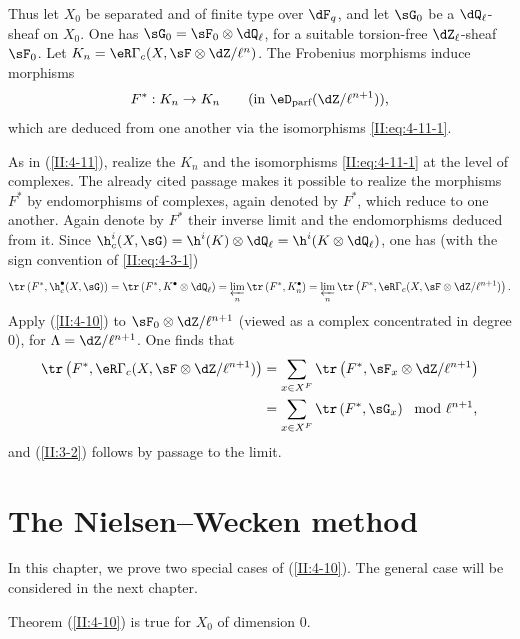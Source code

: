 \documentclass[oneside]{book}
\begin{document}
Thus let $X_0$ be separated and of finite type over $\dF_q$, and let $\sG_0$
be a $\dQ_\ell$-sheaf on $X_0$. One has
$\sG_0=\sF_0\otimes\dQ_\ell$, for a suitable torsion-free
$\dZ_\ell$-sheaf $\sF_0$. Let
$K_n=\eR\Gamma_c(X,\sF\otimes\dZ/\ell^n)$. The Frobenius morphisms induce
morphisms
\[
  F^* : K_n\to K_n \qquad \text{(in $\eD_\text{parf}(\dZ/\ell^{n+1})$),}
\]
which are deduced from one another via the isomorphisms
\eqref{II:eq:4-11-1}.

As in (\ref{II:4-11}), realize the $K_n$ and the isomorphisms
\eqref{II:eq:4-11-1} at the level of complexes. The already cited passage
\cite[XV.3.3]{sga5} makes it possible to realize the morphisms $F^*$ by
endomorphisms of complexes, again denoted by $F^*$, which reduce to one
another. Again denote by $F^*$ their inverse limit and the endomorphisms
deduced from it. Since
$\h_c^i(X,\sG) = \h^i(K)\otimes\dQ_\ell = \h^i(K\otimes\dQ_\ell)$, one has
(with the sign convention of \ref{II:eq:4-3-1})
\[
  \tr\left(F^*, \h_c^\bullet(X,\sG)\right) = \tr\left(F^*,K^\bullet\otimes\dQ_\ell\right) = \varprojlim_n \tr\left(F^*,K_n^\bullet\right) = \varprojlim_n \tr\left(F^*,\eR\Gamma_c(X,\sF\otimes\dZ/\ell^{n+1})\right) \text{.}
\]
Apply (\ref{II:4-10}) to $\sF_0\otimes\dZ/\ell^{n+1}$ (viewed as a complex
concentrated in degree $0$), for $\Lambda=\dZ/\ell^{n+1}$. One finds that
\begin{align*}
  \tr\left(F^*,\eR\Gamma_c(X,\sF\otimes\dZ/\ell^{n+1})\right)
    &= \sum_{x\in X^F} \tr\left(F^*,\sF_x\otimes\dZ/\ell^{n+1}\right) \\
    &= \sum_{x\in X^F} \tr\left(F^*,\sG_x\right) \mod \ell^{n+1} \text{,}
\end{align*}
and (\ref{II:3-2}) follows by passage to the limit.











\section{The Nielsen--Wecken method}\label{II:5}

In this chapter, we prove two special cases of (\ref{II:4-10}). The general
case will be considered in the next chapter.






\begin{lemma_}\label{II:5-1}
Theorem (\ref{II:4-10}) is true for $X_0$ of dimension $0$.
\end{lemma_}
\end{document}
